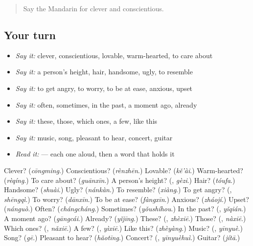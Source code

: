 \label{lesson:ZH-R128-review-123-128}



\begin{quote}
Say the Mandarin for clever and conscientious.
\end{quote}

\subsection*{Your turn}
\begin{itemize}
\raggedright
  \item \emph{Say it:} clever, conscientious, lovable, warm-hearted, to care about
  \item \emph{Say it:} a person's height, hair, handsome, ugly, to resemble
  \item \emph{Say it:} to get angry, to worry, to be at ease, anxious, upset
  \item \emph{Say it:} often, sometimes, in the past, a moment ago, already
  \item \emph{Say it:} these, those, which ones, a few, like this
  \item \emph{Say it:} music, song, pleasant to hear, concert, guitar
  \item \emph{Read it:}    — each one aloud, then a word that holds it
\end{itemize}

\begin{tcolorbox}[breakable,colback=teal!4,colframe=teal!35!black,title={Before you move on}]
Clever? (\emph{cōngming}.) Conscientious? (\emph{rènzhēn}.) Lovable? (\emph{kě'ài}.) Warm-hearted? (\emph{rèqíng}.) To care about? (\emph{guānxīn}.) A person's height? (\textbf{}, \emph{gèzi}.) Hair? (\emph{tóufa}.) Handsome? (\emph{shuài}.) Ugly? (\emph{nánkàn}.) To resemble? (\emph{xiàng}.) To get angry? (\textbf{}, \emph{shēngqì}.) To worry? (\emph{dānxīn}.) To be at ease? (\emph{fàngxīn}.) Anxious? (\emph{zháojí}.) Upset? (\emph{nánguò}.) Often? (\emph{chángcháng}.) Sometimes? (\emph{yǒushíhou}.) In the past? (\textbf{}, \emph{yǐqián}.) A moment ago? (\emph{gāngcái}.) Already? (\emph{yǐjīng}.) These? (\textbf{}, \emph{zhèxiē}.) Those? (\textbf{}, \emph{nàxiē}.) Which ones? (\textbf{}, \emph{nǎxiē}.) A few? (\textbf{}, \emph{yìxiē}.) Like this? (\emph{zhèyàng}.) Music? (\textbf{}, \emph{yīnyuè}.) Song? (\emph{gē}.) Pleasant to hear? (\emph{hǎotīng}.) Concert? (\textbf{}, \emph{yīnyuèhuì}.) Guitar? (\emph{jítā}.)
\end{tcolorbox}
